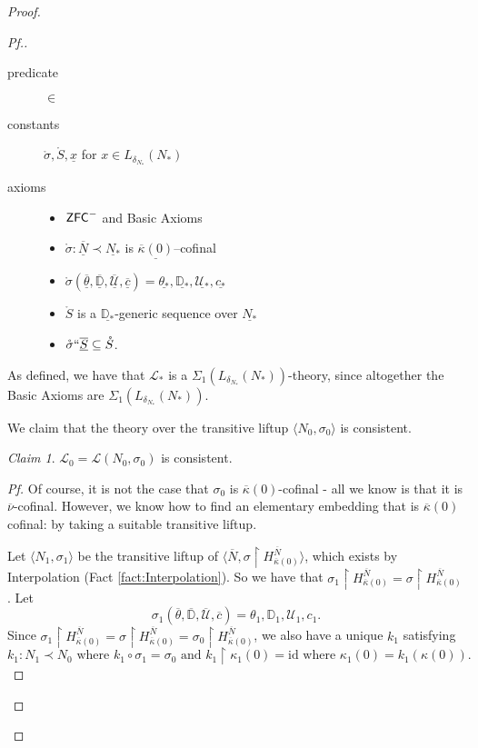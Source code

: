 \documentclass{amsart}
\theoremstyle{definition}
\theoremstyle{remark}
\newtheorem{claimno}{Claim}
\newcommand{\D}{\mathbb{D}}
\newcommand{\N}{{\overline{N}}}
\newcommand{\U}{\mathcal{U}}
\newcommand{\ZFC}{\textup{\ensuremath{\textsf{ZFC}}}}
\DeclareMathOperator{\otp}{otp}
\newcommand{\rest}{\mathbin{\upharpoonright}}
\begin{document}
\begin{proof}
\begin{proof}[Pf.]
\begin{description}
	\item[predicate] $\in$ 
	\item[constants] $\mathring{\sigma}, \mathring S, \underline x$ for $x \in L_{\delta_{N_*}}(N_*)$
	\item[axioms] \begin{itemize} \item $\ZFC^-$ and \textsf{Basic Axioms}
		\item $\mathring \sigma : \underline \N \prec \underline{N_*}$ is $\underline{\overline \kappa(0)}$--cofinal
		\item $\mathring{\sigma}(\overline{\underline{\theta}}, \overline{\underline{\D}}, \overline{\underline{\U}}, \overline{\underline c})=\underline{\theta_*}, \underline{\D_*}, \underline{\U_*}, \underline{c_*}$
		\item $\mathring S$ is a $\underline{\D_*}$-generic sequence over $\underline{N_*}$
		\item $\mathring \sigma ``\overline{\underline S} \subseteq \mathring S$.
	\end{itemize}
\end{description} 

As defined, we have that $\mathcal L_*$ is a $\Sigma_1(L_{\delta_{N_*}}(N_*))$-theory, since altogether the \textsf{Basic Axioms} are $\Sigma_1(L_{\delta_{N_*}}(N_*))$.

We claim that the theory over the transitive liftup $\langle N_0, \sigma_0\rangle$ is consistent.

\begin{claimno} $\mathcal L_0=\mathcal L(N_0, \sigma_0)$ is consistent. \end{claimno}
\begin{proof}[Pf] Of course, it is not the case that $\sigma_0$ is $\overline \kappa(0)$-cofinal - all we know is that it is $\overline \nu$-cofinal. However, we know how to find an elementary embedding that is $\overline \kappa(0)$ cofinal: by taking a suitable transitive liftup.

Let $\langle N_1, \sigma_1 \rangle$ be the transitive liftup of $\langle \N, \sigma \rest H^{\N}_{\overline \kappa(0)} \rangle$, which exists by Interpolation (Fact \ref{fact:Interpolation}). So we have that $\sigma_1 \rest H^\N_{\overline \kappa(0)} = \sigma \rest H^\N_{\overline \kappa(0)}$. Let $$\sigma_1(\overline \theta, \overline{\D}, \overline{\U}, \overline c) = \theta_1, \D_1, \U_1, c_1.$$ 
Since $\sigma_1 \rest H^\N_{\overline \kappa(0)} = \sigma \rest H^\N_{\overline \kappa(0)} = \sigma_0 \rest H^\N_{\overline \kappa(0)}$, we also have a unique $k_1$ satisfying $$ \text{$k_1: N_1 \prec N_0$ where $k_1\circ \sigma_1 = \sigma_0$ and $k_1 \rest \kappa_1(0) = \text{id}$ where $\kappa_1(0)=k_1(\kappa(0))$.}$$ 


\end{proof}
\end{proof}
\end{proof}
\end{document}
